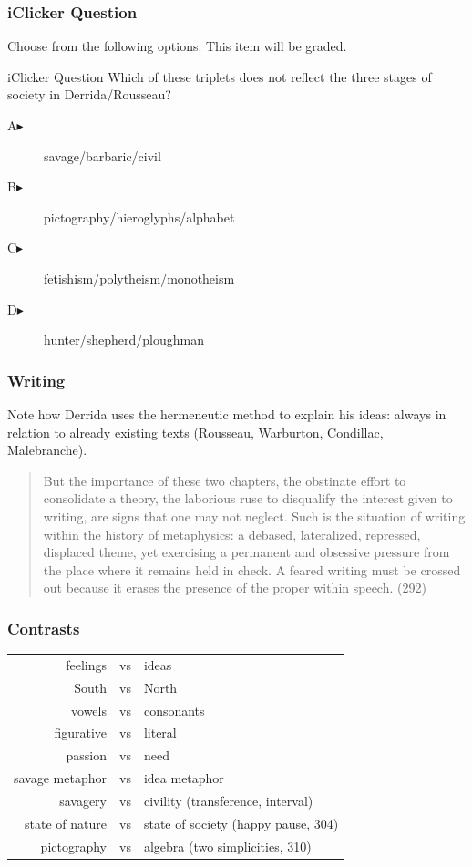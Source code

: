 \documentclass[xcolor=dvipsnames]{beamer}
\begin{document}
\begin{frame}
  \frametitle{iClicker Question}
Choose from the following options. This item will be graded.
\begin{block}{iClicker Question}
Which of these triplets does not reflect the three stages of society in Derrida/Rousseau?
\end{block}
\begin{description}
\item[A\hspace{.2in}$\blacktriangleright$] savage/barbaric/civil
\item[B\hspace{.2in}$\blacktriangleright$] pictography/hieroglyphs/alphabet
\item[C\hspace{.2in}$\blacktriangleright$] fetishism/polytheism/monotheism
\item[D\hspace{.2in}$\blacktriangleright$] hunter/shepherd/ploughman
\end{description}
\end{frame}

\begin{frame}
  \frametitle{Writing}
  Note how Derrida uses the hermeneutic method to explain his ideas:
  always in relation to already existing texts (Rousseau, Warburton,
  Condillac, Malebranche).
  \begin{quote}
    But the importance of these two chapters, the obstinate effort to
    consolidate a theory, the laborious ruse to disqualify the
    interest given to writing, are signs that one may not
    neglect. Such is the situation of writing within the history of
    metaphysics: a debased, lateralized, repressed, displaced theme, yet
    exercising a permanent and obsessive pressure from the place where
    it remains held in check. A feared writing must be crossed out
    because it erases the presence of the proper within speech. (292)
  \end{quote}
\end{frame}

\begin{frame}
  \frametitle{Contrasts}
  \begin{tabular}{rcl}
      feelings & vs & ideas \\
      South & vs & North \\
      vowels & vs & consonants \\
      figurative & vs & literal \\
      passion & vs & need \\
      savage metaphor & vs & idea metaphor \\
      savagery & vs & civility (transference, interval) \\
      state of nature & vs & state of society (happy pause, 304) \\
      pictography & vs & algebra (two simplicities, 310) \\
  \end{tabular}
\end{frame}
\end{document}
